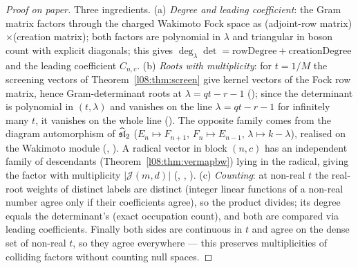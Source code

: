 \begin{proof}[Proof on paper]
Three ingredients. (a) \emph{Degree and leading coefficient}: the Gram matrix factors through the
charged Wakimoto Fock space as (adjoint-row matrix)$\times$(creation matrix); both factors are polynomial
in $\lambda$ and triangular in boson count with explicit diagonals; this gives
$\deg_\lambda\det = \mathrm{rowDegree}+\mathrm{creationDegree}$ and the leading coefficient $C_{n,c}$.
(b) \emph{Roots with multiplicity}: for $t = 1/M$ the screening vectors of Theorem~\ref{l08:thm:screen}
give kernel vectors of the Fock row matrix, hence Gram-determinant roots at $\lambda = qt-r-1$
(\allowbreak{}\allowbreak{}); since the determinant is polynomial in $(t,\lambda)$ and vanishes on
the line $\lambda = qt-r-1$ for infinitely many $t$, it vanishes on the whole line
(\allowbreak{}\allowbreak{}). The opposite family comes from the diagram automorphism of
$\widehat{\mathfrak{sl}}_2$ ($E_n\mapsto F_{n+1}$, $F_n\mapsto E_{n-1}$, $\lambda\mapsto k-\lambda$), realised on the Wakimoto module
(, \allowbreak{}\allowbreak{}\allowbreak{}). A radical vector in
block $(n,c)$ has an independent family of descendants (Theorem~\ref{l08:thm:vermapbw}) lying in the
radical, giving the factor with multiplicity $|\mathcal J(m,d)|$ (\allowbreak{}\allowbreak{}\allowbreak{},
\allowbreak{}\allowbreak{}, \allowbreak{}\allowbreak{}). (c) \emph{Counting}: at
non-real $t$ the real-root weights of distinct labels are distinct (integer linear functions of a non-real
number agree only if their coefficients agree), so the product divides; its degree equals the
determinant's (exact occupation count), and both are compared via leading coefficients. Finally both
sides are continuous in $t$ and agree on the dense set of non-real $t$, so they agree everywhere ---
this preserves multiplicities of colliding factors without counting null spaces.
\end{proof}

